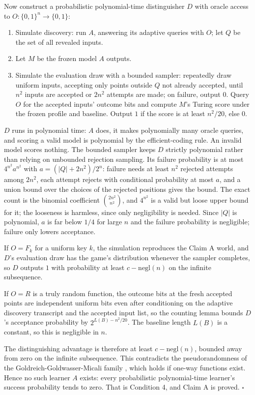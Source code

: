 \documentclass[11pt]{article}
\begin{document}
\begin{itemize}
Now construct a probabilistic polynomial-time distinguisher $D$ with oracle access to $O : \{0,1\}^n \to \{0,1\}$:
\begin{enumerate}
\item Simulate discovery: run $A$, answering its adaptive queries with $O$; let $Q$ be the set of all revealed inputs.
\item Let $M$ be the frozen model $A$ outputs.
\item Simulate the evaluation draw with a bounded sampler: repeatedly draw uniform inputs, accepting only points outside $Q$ not already accepted, until $n^2$ inputs are accepted or $2n^2$ attempts are made; on failure, output $0$. Query $O$ for the accepted inputs' outcome bits and compute $M$'s Turing score under the frozen profile and baseline. Output $1$ if the score is at least $n^2/20$, else $0$.
\end{enumerate}
$D$ runs in polynomial time: $A$ does, it makes polynomially many oracle queries, and scoring a valid model is polynomial by the efficient-coding rule. An invalid model scores nothing. The bounded sampler keeps $D$ strictly polynomial rather than relying on unbounded rejection sampling. Its failure probability is at most $4^{n^2} a^{n^2}$ with $a = (|Q| + 2n^2)/2^n$: failure needs at least $n^2$ rejected attempts among $2n^2$, each attempt rejects with conditional probability at most $a$, and a union bound over the choices of the rejected positions gives the bound. The exact count is the binomial coefficient $\binom{2n^2}{n^2}$, and $4^{n^2}$ is a valid but loose upper bound for it; the looseness is harmless, since only negligibility is needed. Since $|Q|$ is polynomial, $a$ is far below $1/4$ for large $n$ and the failure probability is negligible; failure only lowers acceptance.

If $O = F_k$ for a uniform key $k$, the simulation reproduces the Claim A world, and $D$'s evaluation draw has the game's distribution whenever the sampler completes, so $D$ outputs $1$ with probability at least $c - \mathrm{negl}(n)$ on the infinite subsequence.

If $O = R$ is a truly random function, the outcome bits at the fresh accepted points are independent uniform bits even after conditioning on the adaptive discovery transcript and the accepted input list, so the counting lemma bounds $D$'s acceptance probability by $2^{L(B) - n^2/20}$. The baseline length $L(B)$ is a constant, so this is negligible in $n$.

The distinguishing advantage is therefore at least $c - \mathrm{negl}(n)$, bounded away from zero on the infinite subsequence. This contradicts the pseudorandomness of the Goldreich-Goldwasser-Micali family \cite{ggm1986}, which holds if one-way functions exist. Hence no such learner $A$ exists: every probabilistic polynomial-time learner's success probability tends to zero. That is Condition 4, and Claim A is proved. \hfill$\square$
\end{itemize}
\end{document}
